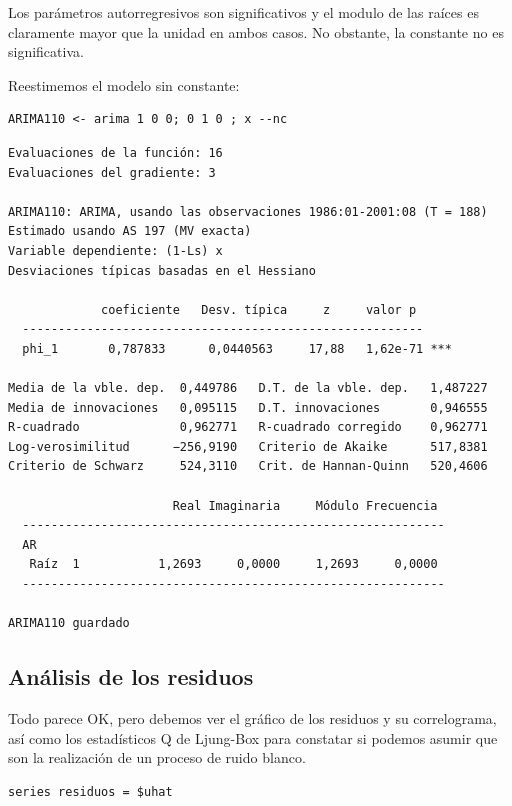 \documentclass[10pt]{article}
\begin{document}
Los parámetros autorregresivos son significativos y el modulo de las
raíces es claramente mayor que la unidad en ambos casos. No obstante,
la constante no es significativa. 

Reestimemos el modelo sin constante:

\begin{verbatim}
ARIMA110 <- arima 1 0 0; 0 1 0 ; x --nc
\end{verbatim}

\begin{verbatim}
Evaluaciones de la función: 16
Evaluaciones del gradiente: 3

ARIMA110: ARIMA, usando las observaciones 1986:01-2001:08 (T = 188)
Estimado usando AS 197 (MV exacta)
Variable dependiente: (1-Ls) x
Desviaciones típicas basadas en el Hessiano

             coeficiente   Desv. típica     z     valor p 
  --------------------------------------------------------
  phi_1       0,787833      0,0440563     17,88   1,62e-71 ***

Media de la vble. dep.  0,449786   D.T. de la vble. dep.   1,487227
Media de innovaciones   0,095115   D.T. innovaciones       0,946555
R-cuadrado              0,962771   R-cuadrado corregido    0,962771
Log-verosimilitud      −256,9190   Criterio de Akaike      517,8381
Criterio de Schwarz     524,3110   Crit. de Hannan-Quinn   520,4606

                       Real Imaginaria     Módulo Frecuencia
  -----------------------------------------------------------
  AR
   Raíz  1           1,2693     0,0000     1,2693     0,0000
  -----------------------------------------------------------

ARIMA110 guardado
\end{verbatim}
\subsection*{Análisis de los residuos}
\label{sec:org8297dd5}

Todo parece OK, pero debemos ver el gráfico de los residuos y su
correlograma, así como los estadísticos Q de Ljung-Box para constatar
si podemos asumir que son la realización de un proceso de ruido
blanco.

\begin{verbatim}
series residuos = $uhat
\end{verbatim}
\end{document}
